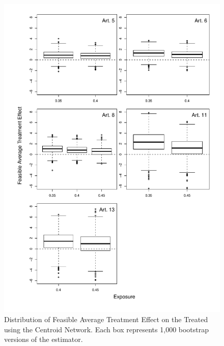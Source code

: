 \documentclass[10pt]{article}
\begin{document}
\begin{figure}[H]
	\centering
	\includegraphics[width=.8\linewidth]{../fig/matching_bloxplot_centroid.pdf}
	\caption{Distribution of Feasible Average Treatment Effect on the Treated using the Centroid Network. Each box represents 1,000 bootstrap versions of the estimator.}
\end{figure}
\end{document}

